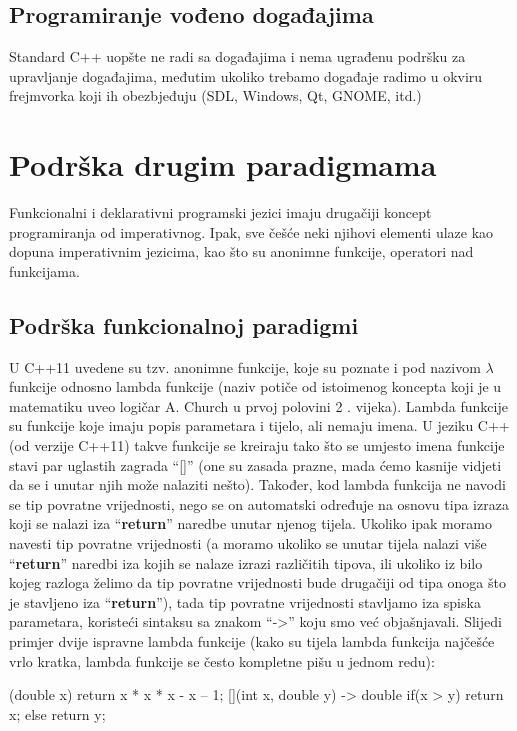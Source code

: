 \documentclass[11pt]{book}
\begin{document}
\subsection{Programiranje vođeno događajima}
Standard  C++  uopšte  ne  radi  sa  događajima  i  nema  ugrađenu  podršku  za  upravljanje događajima,  međutim  ukoliko  trebamo  događaje  radimo  u  okviru  frejmvorka  koji  ih obezbjeđuju (SDL, Windows, Qt, GNOME, itd.)


\section{Podrška drugim paradigmama}
Funkcionalni i deklarativni programski jezici imaju drugačiji koncept programiranja od imperativnog. Ipak, sve češće neki njihovi elementi ulaze kao dopuna imperativnim jezicima, kao što su anonimne funkcije, operatori nad funkcijama.

\subsection{Podrška funkcionalnoj paradigmi}

U C++11 uvedene su tzv. anonimne funkcije, koje su poznate i pod nazivom $\lambda$ funkcije odnosno lambda funkcije (naziv potiče od istoimenog koncepta koji je u matematiku uveo logičar A. Church u prvoj polovini 2 . vijeka). Lambda funkcije su funkcije koje imaju popis parametara i tijelo, ali nemaju imena. U jeziku C++ (od verzije C++11) takve funkcije se kreiraju tako što se umjesto imena funkcije stavi par uglastih zagrada “[]” (one su zasada prazne, mada ćemo kasnije vidjeti da se i unutar njih može nalaziti nešto). Također, kod lambda funkcija ne navodi se tip povratne vrijednosti, nego se on automatski određuje na osnovu tipa izraza koji se nalazi iza “\textbf{return}” naredbe unutar njenog tijela. Ukoliko ipak moramo navesti tip povratne vrijednosti (a moramo ukoliko se unutar tijela nalazi više “\textbf{return}” naredbi iza kojih se nalaze izrazi različitih tipova, ili ukoliko iz bilo kojeg razloga želimo da tip povratne vrijednosti bude drugačiji od tipa onoga što je stavljeno iza “\textbf{return}”), tada tip povratne vrijednosti stavljamo iza spiska parametara, koristeći sintaksu sa znakom “->” koju smo već objašnjavali. Slijedi primjer dvije ispravne lambda funkcije (kako su tijela lambda funkcija najčešće vrlo kratka, lambda funkcije se često kompletne pišu u jednom redu):
\begin{shortlisting}
  [](double x) { return x * x * x - x – 1; }
  [](int x, double y) -> double { if(x > y) return x; else return y; }
\end{shortlisting}
\end{document}
